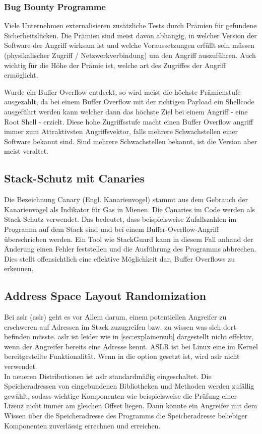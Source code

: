 \subsubsection{Bug Bounty Programme} \label{sec:bounties}
Viele Unternehmen externalisieren zusätzliche Tests durch Prämien für gefundene Sicherheitslücken.
Die Prämien sind meist davon abhängig, in welcher Version der Software der Angriff 
wirksam ist und welche Voraussetzungen erfüllt sein müssen (physikalischer Zugriff / Netzwerkverbindung)
um den Angriff auszuführen. Auch wichtig für die Höhe der Prämie ist, welche art des Zugriffes
der Angriff ermöglicht.

Wurde ein Buffer Overflow entdeckt, so wird meist die höchste Prämienstufe ausgezahlt, da bei einem
Buffer Overflow mit der richtigen Payload ein Shellcode ausgeführt werden kann welcher dann das
höchste Ziel bei einem Angriff - eine Root Shell - erzielt.
Diese hohe Zugriffsstufe macht einen Buffer Overflow angriff immer zum Attraktivsten Angriffsvektor,
falls mehrere Schwachstellen einer Software bekannt sind. Sind mehrere Schwachstellen bekannt, ist die
Version aber meist veraltet. 


\subsection{Stack-Schutz mit Canaries} \label{sec:canaries}
Die Bezeichnung Canary (Engl. Kanarienvogel) stammt aus dem Gebrauch der Kanarienvögel als
Indikator für Gas in Mienen. Die Canaries im Code werden als Stack-Schutz verwendet. Das bedeutet,
dass beispielsweise Zufallszahlen im Programm auf dem Stack sind und bei einem Buffer-Overflow-Angriff
überschrieben werden. Ein Tool wie StackGuard kann in diesem Fall anhand der Änderung einen Fehler feststellen und
die Ausführung des Programms abbrechen. Dies stellt offensichtlich eine effektive Möglichkeit dar,
Buffer Overflows zu erkennen. 

\subsection{Address Space Layout Randomization} \label{sec:aslr}
Bei \acrlong*{aslr} (\acrshort*{aslr}) geht es vor Allem darum, einem potentiellen Angreifer zu erschweren
auf Adressen im Stack zuzugreifen bzw. zu wissen was sich dort befinden müsste.
\gls*{aslr} ist leider wie in \autoref{sec:explainersub} dargestellt nicht effektiv, wenn der Angreifer
bereits eine Adresse kennt.
ASLR ist bei Linux eine im Kernel bereitgestellte Funktionalität.
Wenn in  die option  gesetzt ist,
wird \gls*{aslr}  nicht verwendet. \cite{aslrandrew} \\
In neueren Distributionen ist \gls*{aslr} standardmäßig eingeschaltet.
Die Speicheradressen von eingebundenen Bibliotheken und Methoden werden
zufällig gewählt, sodass wichtige Komponenten wie beispielsweise die
Prüfung einer Lizenz nicht immer am gleichen Offset liegen. Dann könnte ein Angreifer
mit dem Wissen über die Speicheradresse des Programms die Speicheradresse beliebiger
Komponenten zuverlässig errechnen und erreichen.

